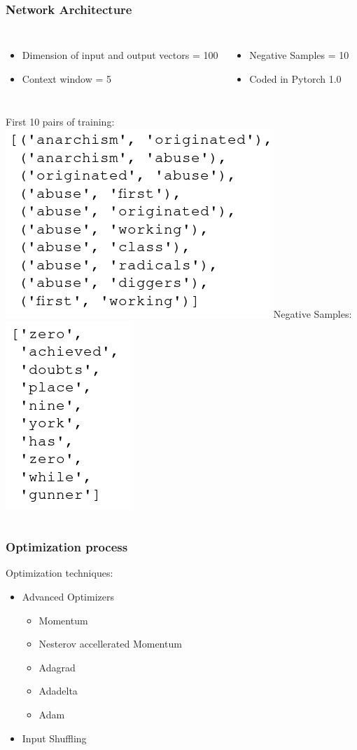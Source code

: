 \begin{frame}
\frametitle{Network Architecture} 
\begin{columns}
\begin{itemize}
\item Dimension of input and output vectors = 100
\item Context window  = 5
\end{itemize}
    \begin{itemize}
    \item Negative Samples = 10 
\item Coded in Pytorch 1.0
\end{itemize}
  \end{columns}
  \bigskip
\begin{columns}
    		First 10 pairs of training:
        \includegraphics[scale=0.35]{images/pairs_example}    
        Negative Samples:\\
        \includegraphics[scale=0.35]{images/neg_samples_example}
  \end{columns}
\end{frame}

\begin{frame}
\frametitle{Optimization process}
Optimization techniques:
\begin{itemize}
\item Advanced Optimizers
\begin{itemize}
\item Momentum
\item Nesterov accellerated Momentum 
\item Adagrad 
\item Adadelta
\item Adam
\end{itemize}
\item Input Shuffling
\end{itemize}
\end{frame}
